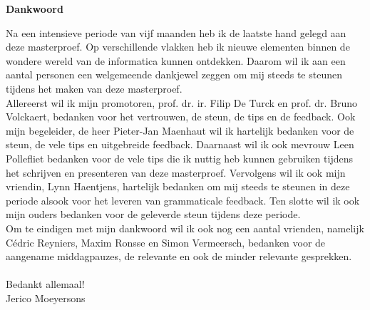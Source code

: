 \thispagestyle{empty}    %

\begin{center}
\textbf{Dankwoord}
\end{center}

Na een intensieve periode van vijf maanden heb ik de laatste hand gelegd aan deze masterproef. Op verschillende vlakken heb ik nieuwe elementen binnen de wondere wereld van de informatica kunnen ontdekken. Daarom wil ik aan een aantal personen een welgemeende dankjewel zeggen om mij steeds te steunen tijdens het maken van deze masterproef.\\

Allereerst wil ik mijn promotoren, prof. dr. ir. Filip De Turck en prof. dr. Bruno Volckaert, bedanken voor het vertrouwen, de steun, de tips en de feedback. Ook mijn begeleider, de heer Pieter-Jan Maenhaut wil ik hartelijk bedanken voor de steun, de vele tips en uitgebreide feedback. Daarnaast wil ik ook mevrouw Leen Pollefliet bedanken voor de vele tips die ik nuttig heb kunnen gebruiken tijdens het schrijven en presenteren van deze masterproef. Vervolgens wil ik ook mijn vriendin, Lynn Haentjens, hartelijk bedanken om mij steeds te steunen in deze periode alsook voor het leveren van grammaticale feedback. Ten slotte wil ik ook mijn ouders bedanken voor de geleverde steun tijdens deze periode.\\

Om te eindigen met mijn dankwoord wil ik ook nog een aantal vrienden, namelijk Cédric Reyniers, Maxim Ronsse en Simon Vermeersch, bedanken voor de aangename middagpauzes, de relevante en ook de minder relevante gesprekken.\\
\\
Bedankt allemaal!\\
Jerico Moeyersons